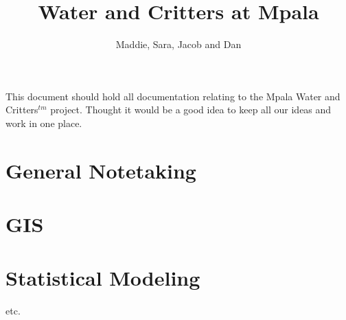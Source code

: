 \documentclass{article}
\title{Water and Critters at Mpala}
\author{Maddie, Sara, Jacob and Dan}
\date{}
\begin{document}
\maketitle

This document should hold all documentation relating to the Mpala Water and
Critters$^{tm}$ project. Thought it would be a good idea to keep all our ideas
and work in one place.

\section{General Notetaking}


\section{GIS}


\section{Statistical Modeling}

etc.
\end{document}
